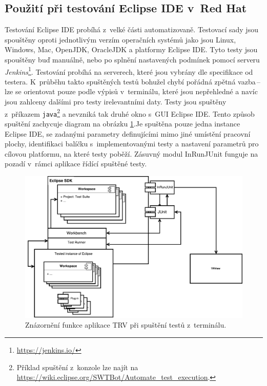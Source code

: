     \subsection{Použití při testování Eclipse IDE v~Red Hat}
    Testování Eclipse IDE probíhá z~velké části automatizovaně. Testovací sady jsou spouštěny oproti jednotlivým verzím operačních systémů jako jsou Linux, Windows, Mac, OpenJDK, OracleJDK a platformy Eclipse IDE. Tyto testy jsou spouštěny buď manuálně, nebo po splnění nastavených podmínek pomocí serveru \emph{Jenkins}\footnote{\url{https://jenkins.io/}}. Testování probíhá na serverech, které jsou vybrány dle specifikace od testera. K~průběhu takto spuštěných testů bohužel chybí pořádná zpětná vazba\,--\,lze se orientovat pouze podle výpisů v~terminálu, které jsou nepřehledné a navíc jsou zahlceny dalšími pro testy irelevantními daty. Testy jsou spuštěny z~příkazem \texttt{java}\footnote{Příklad spuštění z~konzole lze najít na \url{https://wiki.eclipse.org/SWTBot/Automate_test_execution}.} a nevzniká tak druhé okno s~GUI Eclipse IDE. Tento způsob spuštění zachycuje diagram na obrázku \ref{fig:TRV_run_from_term}.Je spuštěna pouze jedna instance Eclipse IDE, se zadanými parametry definujícími mimo jiné umístění pracovní plochy, identifikaci balíčku s~implementovanými testy a nastavení parametrů pro cílovou platformu, na které testy poběží. Zásuvný modul InRunJUnit funguje na pozadí v~rámci aplikace řídící spuštěné testy.

    \begin{figure}
	\includegraphics[width=\textwidth, center]{obrazky-figures/TRV_run_from_term.pdf}
	\caption{Znázornění funkce aplikace TRV při spuštění testů z~terminálu.}
	\label{fig:TRV_run_from_term}
      \end{figure}

